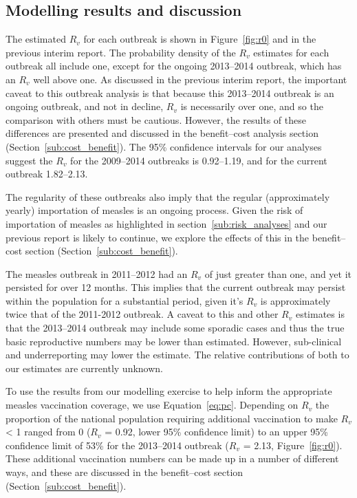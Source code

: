 \documentclass{article}
\begin{document}
\subsection{Modelling results and discussion}

The estimated $R_v$ for each outbreak is shown in Figure~\ref{fig:r0} and in the previous interim report. The probability density of the $R_v$ estimates for each outbreak all include one, except for the ongoing 2013--2014 outbreak, which has an $R_v$ well above one. As discussed in the previous interim report, the important caveat to this outbreak analysis is that because this 2013--2014 outbreak is an ongoing outbreak, and not in decline, $R_v$ is necessarily over one, and so the comparison with others must be cautious. However, the results of these differences are presented and discussed in the benefit--cost analysis section (Section~\ref{sub:cost_benefit}). The 95\% confidence intervals for our analyses suggest the $R_v$ for the 2009--2014 outbreaks is 0.92--1.19, and for the current outbreak 1.82--2.13.

The regularity of these outbreaks also imply that the regular (approximately yearly) importation of measles is an ongoing process. Given the risk of importation of measles as highlighted in section~\ref{sub:risk_analyses} and our previous report is likely to continue, we explore the effects of this in the benefit--cost section (Section~\ref{sub:cost_benefit}).

The measles outbreak in 2011--2012 had an $R_v$ of just greater than one, and yet it persisted for over 12 months. This implies that the current outbreak may persist within the population for a substantial period, given it's $R_v$ is approximately twice that of the 2011-2012 outbreak. A caveat to this and other $R_v$ estimates is that the 2013--2014 outbreak may include some sporadic cases and thus the true basic reproductive numbers may be lower than estimated. However, sub-clinical and underreporting may lower the estimate. The relative contributions of both to our estimates are currently unknown.

To use the results from our modelling exercise to help inform the appropriate measles vaccination coverage, we use Equation~\ref{eq:pc}. Depending on $R_v$ the proportion of the national population requiring additional vaccination to make $R_v$ < 1 ranged from 0 ($R_v$ = 0.92, lower 95\% confidence limit) to an upper 95\% confidence limit of 53\% for the 2013--2014 outbreak ($R_v$ = 2.13, Figure~\ref{fig:r0}). These additional vaccination numbers can be made up in a number of different ways, and these are discussed in the benefit--cost section (Section~\ref{sub:cost_benefit}).
\end{document}

